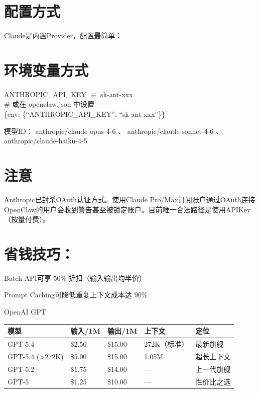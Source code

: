 \documentclass[
  10
]{article}
\newcounter{none} %
\begin{document}
\section{配置方式}\label{ux914dux7f6eux65b9ux5f0f}

Claude是内置Provider，配置最简单：

\section{环境变量方式}\label{ux73afux5883ux53d8ux91cfux65b9ux5f0f}

ANTHROPIC\_API\_KEY \(\equiv\) sk-ant-xxx\\
\# 或在 openclaw.json 中设置\\
\{env: \{``ANTHROPIC\_API\_KEY'': ``sk-ant-xxx''\}\}

模型ID： anthropic/claude-opus-4-6 、 anthropic/claude-sonnet-4-6 、
anthropic/claude-haiku-4-5

\section{注意}\label{ux6ce8ux610f-14}

Anthropic已封杀OAuth认证方式。使用Claude
Pro/Max订阅账户通过OAuth连接OpenClaw的用户会收到警告甚至被锁定账户。目前唯一合法路径是使用APIKey（按量付费）。

\section{省钱技巧：}\label{ux7701ux94b1ux6280ux5de7}

Batch API可享 \(5 0 \%\) 折扣（输入输出均半价）

Prompt Caching可降低重复上下文成本达 \(9 0 \%\)

OpenAI GPT

{\def\LTcaptype{none} %
\begin{longtable}[]{@{}|l|l|l|l|l|@{}}
\toprule\noalign{}
\endhead
\bottomrule\noalign{}
\endlastfoot
\hline
模型 & 输入/1M & 输出/1M & 上下文 & 定位 \\
\hline
GPT-5.4 & \$2.50 & \$15.00 & 272K（标准） & 最新旗舰 \\
\hline
GPT-5.4 (\textgreater272K) & \$5.00 & \$15.00 & 1.05M & 超长上下文 \\
\hline
GPT-5.2 & \$1.75 & \$14.00 & --- & 上一代旗舰 \\
\hline
GPT-5 & \$1.25 & \$10.00 & --- & 性价比之选 \\
\hline
\end{longtable}
}
\end{document}
